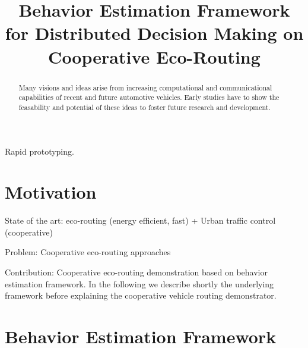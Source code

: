 \documentclass[conference]{../cls/IEEEtran}
\begin{document}
\title{Behavior Estimation Framework for Distributed Decision Making on Cooperative Eco-Routing}

\author{
	\and
}

\maketitle

\begin{abstract}
Many visions and ideas arise from increasing computational and communicational capabilities of recent and future automotive vehicles.
Early studies have to show the feasability and potential of these ideas to foster future research and development.
\end{abstract}

\begin{IEEEkeywords}
Rapid prototyping.
\end{IEEEkeywords}

\section{Motivation}

State of the art: eco-routing (energy efficient, fast) + Urban traffic control (cooperative)

Problem: Cooperative eco-routing approaches

Contribution: Cooperative eco-routing demonstration based on behavior estimation framework.
In the following we describe shortly the underlying framework before explaining the cooperative vehicle routing demonstrator.

\section{Behavior Estimation Framework}
\end{document}
